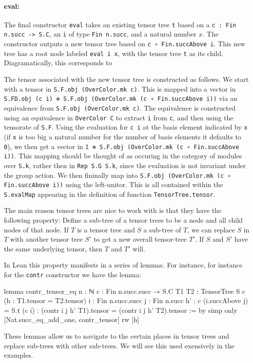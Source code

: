 \documentclass[a4paper, 11pt]{article}
\newcommand{\tensorTree}[1]{
\begin{center}
  \fcolorbox{mycolor}{white}{%
#1}
\end{center}
}
\begin{document}
\paragraph{eval:}
The final constructor \lstinline|eval| takes an existing tensor tree \lstinline|t| based on a \lstinline|c : Fin n.succ -> S.C|,
an \lstinline|i| of type \lstinline|Fin n.succ|, and a natural number $x$.  
The constructor outputs a new tensor tree based on \lstinline|c ∘ Fin.succAbove i|.
This new tree has a root node labeled \lstinline|eval i x|, with the tensor tree \lstinline|t| as its child.
Diagramatically, this corresponds to 
\tensorTree{
  \begin{tikzpicture}
    \node[draw=black] (A) at (0,0) {\lstinline|eval i x|};
    \node (B) at (0,-1) {\lstinline|t|};
    \draw[->] (A) -- (B);
  \end{tikzpicture} 
}
The tensor associated with the new tensor tree is constructed as follows.
We start with a tensor in \lstinline|S.F.obj (OverColor.mk c)|.
This is mapped into a vector in \lstinline|S.FD.obj (c i) ⊗ S.F.obj (OverColor.mk (c ∘ Fin.succAbove i))| via an equivalence from
\lstinline|S.F.obj (OverColor.mk c)|. The equivalence is constructed using an equivalence
in \lstinline|OverColor C| to extract \lstinline|i| from \lstinline|c|, and
then using the tensorate of \lstinline|S.F|.
Using the evaluation for \lstinline|c i| at the basis element indicated by \lstinline|x| (if \lstinline|x| is too big a natural number for the number of basis elements it defaults to \lstinline|0|), we then get a vector in
\lstinline|𝟙 ⊗ S.F.obj (OverColor.mk (c ∘ Fin.succAbove i))|.
This mapping should be thought of as occuring in the  category of modules over \lstinline|S.k|, rather then in 
\lstinline|Rep S.G S.k|, since the evaluation is not invariant under the group action.
We then fininally map  into \lstinline|S.F.obj (OverColor.mk (c ∘ Fin.succAbove i))| 
using the left-unitor. This is all contained within the \lstinline|S.evalMap| appearing in the definition of
function \lstinline|TensorTree.tensor|.

The main reason tensor trees are nice to work with is that they have the following property: 
Define a sub-tree of a tensor trees 
to be a node and all child nodes of that node. 
If $T$ is a tensor tree and $S$ a sub-tree of $T$, we can replace $S$ in $T$ 
with another tensor tree $S'$
to get a new overall tensor-tree $T'$. If $S$ and $S'$ have the same underlying tensor, 
then $T$ and $T'$ will. 

In Lean this property manifests in a series of lemmas. For instance, for instance 
for the \lstinline|contr| constructor we have the lemma: 
\begin{code}
lemma contr_tensor_eq {n : ℕ} {c : Fin n.succ.succ → S.C} {T1 T2 : TensorTree S c}
    (h : T1.tensor = T2.tensor) {i : Fin n.succ.succ} {j : Fin n.succ}
    {h' : c (i.succAbove j) = S.τ (c i)} :
    (contr i j h' T1).tensor = (contr i j h' T2).tensor := by
  simp only [Nat.succ_eq_add_one, contr_tensor]
  rw [h]
\end{code}
These lemmas allow us to navigate to the certain places in tensor trees and replace 
sub-trees with other sub-trees. We will see this used exensively in the examples. 
\end{document}
